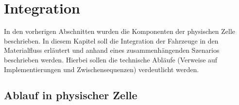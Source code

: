 \section{Integration}
In den vorherigen Abschnitten wurden die Komponenten der physischen Zelle beschrieben. In diesem Kapitel soll die Integration der Fahrzeuge in den Materialfluss erläutert und anhand eines zusammenhängenden Szenarios beschrieben werden. Hierbei sollen die technische Abläufe (Verweise auf Implementierungen und Zwischensequenzen) verdeutlicht werden.

\subsection{Ablauf in physischer Zelle}
